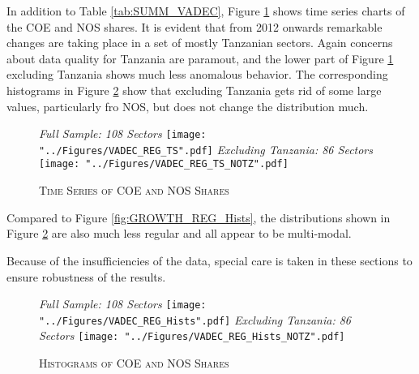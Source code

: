 \documentclass[a4paper]{article}
\begin{document}
In addition to Table \ref{tab:SUMM_VADEC}, Figure \ref{fig:VADEC_REG_TS} shows time series charts of the COE and NOS shares. It is evident that from 2012 onwards remarkable changes are taking place in a set of mostly Tanzanian sectors. Again concerns about data quality for Tanzania are paramout, and the lower part of Figure \ref{fig:VADEC_REG_TS} excluding Tanzania shows much less anomalous behavior. The corresponding histograms in Figure \ref{fig:VADEC_REG_Hists} show that excluding Tanzania gets rid of some large values, particularly fro NOS, but does not change the distribution much. 

\begin{figure}[h!]
\centering
\caption{\label{fig:VADEC_REG_TS}\textsc{Time Series of COE and NOS Shares}}
\textit{Full Sample: 108 Sectors}
\texttt{[image: "../Figures/VADEC\_REG\_TS".pdf]} %
\textit{Excluding Tanzania: 86 Sectors}
\texttt{[image: "../Figures/VADEC\_REG\_TS\_NOTZ".pdf]} %
\end{figure}
\FloatBarrier

Compared to Figure \ref{fig:GROWTH_REG_Hists}, the distributions shown in Figure \ref{fig:VADEC_REG_Hists} are also much less regular and all appear to be multi-modal. \newline

Because of the insufficiencies of the data, special care is taken in these sections to ensure robustness of the results. 

\begin{figure}[h!]
\centering
\caption{\label{fig:VADEC_REG_Hists}\textsc{Histograms of COE and NOS Shares}}
\textit{Full Sample: 108 Sectors}
\texttt{[image: "../Figures/VADEC\_REG\_Hists".pdf]} %
\textit{Excluding Tanzania: 86 Sectors}
\texttt{[image: "../Figures/VADEC\_REG\_Hists\_NOTZ".pdf]} %
\end{figure}
\FloatBarrier
\end{document}
